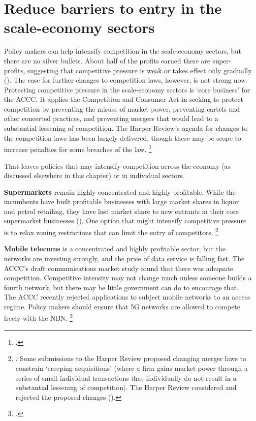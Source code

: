 \section{Reduce barriers to entry in the scale-economy sectors}
Policy makers can help intensify competition in the scale-economy sectors, but there are no silver bullets. About half of the profits earned there are super-profits, suggesting that competitive pressure is weak or takes effect only gradually ().
The case for further changes to competition laws, however, is not strong now.
Protecting competitive pressure in the scale-economy sectors is `core business' for the ACCC\@.
It applies the Competition and Consumer Act in seeking to protect competition by preventing the misuse of market power, preventing cartels and other concerted practices, and preventing mergers that would lead to a substantial lessening of competition. The Harper Review's agenda for changes to the competition laws has been largely delivered, though there may be scope to increase penalties for some breaches of the law.%
\footcites{Harper2015Competition}{Morrison2017Competition}{Caronpenalties2017}

That leaves policies that may intensify competition across the economy (as discussed elsewhere in this chapter) or in individual sectors.%

\textbf{Supermarkets} remain highly concentrated and highly profitable. While the incumbents have built profitable businesses with large market shares in liquor and petrol retailing, they have lost market share to new entrants in their core supermarket businesses (). One option that might intensify competitive pressure is to relax zoning restrictions that can limit the entry of competitors.%
\footnote{\textcites{ACCC-grocery-2008}{PC-retail-2011}. Some submissions to the Harper Review proposed changing merger laws to constrain `creeping acquisitions' (where a firm gains market power through a series of small individual transactions that individually do not result in a substantial lessening of competition). The Harper Review considered and rejected the proposed changes (\textcite{Harper2015Competition}).}


\textbf{Mobile telecoms} is a concentrated and highly profitable sector, but the networks are investing strongly, and the price of data service is falling fast. The ACCC's draft communications market study found that there was adequate competition. Competitive intensity may not change much unless someone builds a fourth network, but there may be little government can do to encourage that. The ACCC recently rejected applications to subject mobile networks to an access regime. Policy makers should ensure that 5G networks are allowed to compete freely with the NBN.%
\footcites{ACCCCommsMarketStudyDraft2017}{ACCC-mobile-services}

